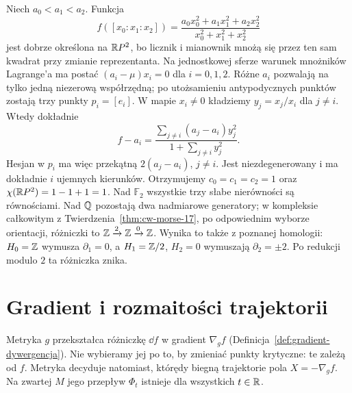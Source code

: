 \begin{przyklad}
\label{prz:morse-rp2-22}
Niech $a_0<a_1<a_2$. Funkcja
\[
 f([x_0:x_1:x_2])
 =\frac{a_0x_0^2+a_1x_1^2+a_2x_2^2}
        {x_0^2+x_1^2+x_2^2}
\]
jest dobrze określona na $\mathbb{R} P^2$, bo licznik i mianownik
mnożą się przez ten sam kwadrat przy zmianie reprezentanta.
Na jednostkowej sferze warunek mnożników Lagrange'a ma postać
$(a_i-\mu)x_i=0$ dla $i=0,1,2$.
Różne $a_i$ pozwalają na tylko jedną niezerową współrzędną;
po utożsamieniu antypodycznych punktów zostają trzy punkty $p_i=[e_i]$.
W mapie $x_i\ne0$ kładziemy $y_j=x_j/x_i$ dla $j\ne i$.
Wtedy dokładnie
\[
 f-a_i=\frac{\sum_{j\ne i}(a_j-a_i)y_j^2}
                  {1+\sum_{j\ne i}y_j^2}.
\]
Hesjan w $p_i$ ma więc przekątną $2(a_j-a_i)$, $j\ne i$.
Jest niezdegenerowany i ma dokładnie $i$ ujemnych kierunków.
Otrzymujemy $c_0=c_1=c_2=1$ oraz
$\chi(\mathbb{R} P^2)=1-1+1=1$.
Nad $\mathbb F_2$ wszystkie trzy słabe nierówności są równościami.
Nad $\mathbb{Q}$ pozostają dwa nadmiarowe generatory; w kompleksie
całkowitym z Twierdzenia~\ref{thm:cw-morse-17},
po odpowiednim wyborze orientacji, różniczki to
$\mathbb{Z}\xrightarrow{2}\mathbb{Z}\xrightarrow{0}\mathbb{Z}$.
Wynika to także z poznanej homologii:
$H_0=\mathbb{Z}$ wymusza $\partial_1=0$, a
$H_1=\mathbb{Z}/2$, $H_2=0$ wymuszają $\partial_2=\pm2$.
Po redukcji modulo $2$ ta różniczka znika.
\end{przyklad}

\section{Gradient i rozmaitości trajektorii}
\label{sec:gradient-morse-17}

Metryka $g$ przekształca różniczkę
$\dd f$ w gradient $\nabla_g f$
(Definicja~\ref{def:gradient-dywergencja}).
Nie wybieramy jej po to, by zmieniać
punkty krytyczne: te zależą od $f$.
Metryka decyduje natomiast, którędy
biegną trajektorie pola
$X=-\nabla_g f$.
Na zwartej $M$ jego przepływ
$\Phi_t$ istnieje dla wszystkich
$t\in\mathbb{R}$.

